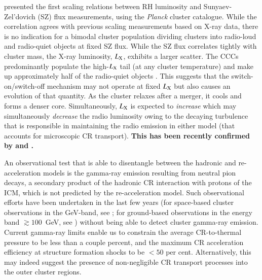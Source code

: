 \documentclass[useAMS,usenatbib]{mn2e}
\begin{document}
\cite{2012MNRAS.421L.112B} presented the first scaling relations
between RH luminosity and Sunyaev-Zel'dovich (SZ) flux measurements, using the
\emph{Planck} cluster catalogue. While the correlation agrees with previous
scaling measurements based on X-ray data, there is no indication for a bimodal
cluster population dividing clusters into radio-loud and radio-quiet objects at
fixed SZ flux. While the SZ flux correlates tightly with cluster mass, the X-ray
luminosity, $L_{\mathrm{X}}$, exhibits a larger scatter. The CCCs predominantly
populate the high-$L_{\mathrm{X}}$ tail (at any cluster temperature) and make up
approximately half of the radio-quiet objects \citep{2011A&A...527A..99E}. This
suggests that the switch-on/switch-off mechanism may not operate at fixed
$L_{\mathrm{X}}$ but also causes an evolution of that quantity. As the cluster
relaxes after a merger, it cools and forms a denser core. Simultaneously,
$L_{\mathrm{X}}$ is expected to {\em increase} which may simultaneously {\em
  decrease} the radio luminosity owing to the decaying turbulence that is
responsible in maintaining the radio emission in either model (that accounts for
microscopic CR transport). {\bf This has been recently confirmed by 
\cite{2013arXiv1307.3049S} and \cite{2013arXiv1306.4379C}.}
 
An observational test that is able to disentangle between the hadronic and
re-acceleration models is the gamma-ray emission resulting from neutral pion
decays, a secondary product of the hadronic CR interaction with protons of the
ICM, which is not predicted by the re-acceleration model. Such observational
efforts have been undertaken in the last few years (for space-based cluster
observations in the GeV-band, see \citealt{2003ApJ...588..155R,
  2010JCAP...05..025A,2010ApJ...717L..71A,2012arXiv1207.6749H,
  2013arXiv1308.5654T,2013arXiv1308.6278H,2013arXiv1309.0197P}; for ground-based
observations in the energy band $\gtrsim100$~GeV, see
\citealt{2006ApJ...644..148P, 2008AIPC.1085..569P,
  2009arXiv0907.0727T,2009A&A...495...27A, 2009arXiv0907.3001D,
  2009arXiv0907.5000G, cangaroo_clusters, 2009ApJ...706L.275A,
  2010ApJ...710..634A, 2011arXiv1111.5544M,2012...VERITAS,2012A&A...545A.103H})
without being able to detect cluster gamma-ray emission. Current gamma-ray
limits enable us to constrain the average CR-to-thermal pressure to be less than
a couple percent, and the maximum CR acceleration efficiency at structure
formation shocks to be $<50$ per cent. Alternatively, this may indeed suggest the
presence of non-negligible CR transport processes into the outer cluster
regions.
\end{document}
